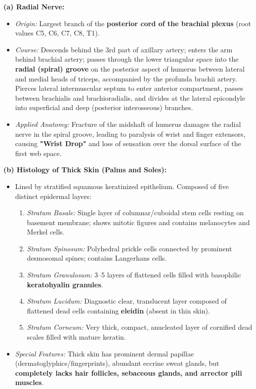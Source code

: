 \documentclass[11pt,a4paper]{article}
\begin{document}
\begin{ansbox}
\textbf{(a) Radial Nerve:}
\begin{itemize}[leftmargin=*]
    \item \textit{Origin:} Largest branch of the \textbf{posterior cord of the brachial plexus} (root values C5, C6, C7, C8, T1).
    \item \textit{Course:} Descends behind the 3rd part of axillary artery; enters the arm behind brachial artery; passes through the lower triangular space into the \textbf{radial (spiral) groove} on the posterior aspect of humerus between lateral and medial heads of triceps, accompanied by the profunda brachii artery. Pierces lateral intermuscular septum to enter anterior compartment, passes between brachialis and brachioradialis, and divides at the lateral epicondyle into superficial and deep (posterior interosseous) branches.
    \item \textit{Applied Anatomy:} Fracture of the midshaft of humerus damages the radial nerve in the spiral groove, leading to paralysis of wrist and finger extensors, causing \textbf{"Wrist Drop"} and loss of sensation over the dorsal surface of the first web space.
\end{itemize}

\textbf{(b) Histology of Thick Skin (Palms and Soles):}
\begin{itemize}[leftmargin=*]
    \item Lined by stratified squamous keratinized epithelium. Composed of five distinct epidermal layers:
    \begin{enumerate}
        \item \textit{Stratum Basale:} Single layer of columnar/cuboidal stem cells resting on basement membrane; shows mitotic figures and contains melanocytes and Merkel cells.
        \item \textit{Stratum Spinosum:} Polyhedral prickle cells connected by prominent desmosomal spines; contains Langerhans cells.
        \item \textit{Stratum Granulosum:} 3--5 layers of flattened cells filled with basophilic \textbf{keratohyalin granules}.
        \item \textit{Stratum Lucidum:} Diagnostic clear, translucent layer composed of flattened dead cells containing \textbf{eleidin} (absent in thin skin).
        \item \textit{Stratum Corneum:} Very thick, compact, anucleated layer of cornified dead scales filled with mature keratin.
    \end{enumerate}
    \item \textit{Special Features:} Thick skin has prominent dermal papillae (dermatoglyphics/fingerprints), abundant eccrine sweat glands, but \textbf{completely lacks hair follicles, sebaceous glands, and arrector pili muscles}.
\end{itemize}


\end{ansbox}
\end{document}
